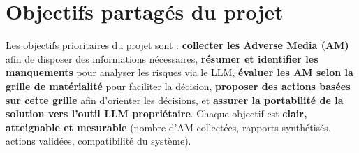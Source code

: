 \section{Objectifs partagés du projet}
Les objectifs prioritaires du projet sont : \textbf{collecter les Adverse Media (AM)} afin de disposer des informations nécessaires, \textbf{résumer et identifier les manquements} pour analyser les risques via le LLM, \textbf{évaluer les AM selon la grille de matérialité} pour faciliter la décision, \textbf{proposer des actions basées sur cette grille} afin d’orienter les décisions, et \textbf{assurer la portabilité de la solution vers l’outil LLM propriétaire}. Chaque objectif est \textbf{clair, atteignable et mesurable} (nombre d’AM collectées, rapports synthétisés, actions validées, compatibilité du système).
